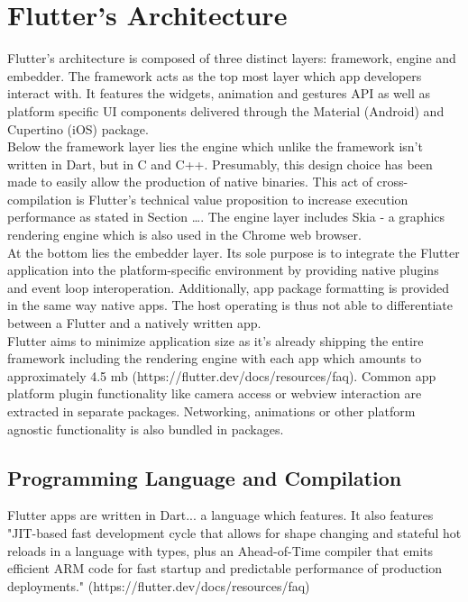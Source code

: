 \section{Flutter's Architecture} \label{section::flutter_architecture}
Flutter's architecture is composed of three distinct layers: framework, engine and embedder. The framework acts as the top most layer which 
app developers interact with. It features the widgets, animation and gestures API as well as platform specific UI components delivered through
the Material (Android) and Cupertino (iOS) package.
\\
Below the framework layer lies the engine which unlike the framework isn't written in Dart, but in C and C++. Presumably, this design choice has been 
made to easily allow the production of native binaries. This act of cross-compilation is Flutter's technical value proposition to increase execution performance as stated in 
Section \dots. The engine layer includes Skia - a graphics rendering engine which is also used in the Chrome web browser.
\\
At the bottom lies the embedder layer. Its sole purpose is to integrate the Flutter application into the platform-specific environment
by providing native plugins and event loop interoperation. 
Additionally, app package formatting is provided in the same way native apps. The host operating is thus not able to differentiate between a Flutter and
a natively written app.\\ 
Flutter aims to minimize application size as it's already shipping the entire framework including the rendering engine with each app which amounts
to approximately 4.5 mb (https://flutter.dev/docs/resources/faq). Common app platform plugin functionality like camera access or webview interaction are extracted in separate packages.
Networking, animations or other platform agnostic functionality is also bundled in packages. 


\subsection{Programming Language and Compilation}
Flutter apps are written in Dart... a language which features. It also features 
"JIT-based fast development cycle that allows for shape changing and stateful hot reloads in a language with types, 
plus an Ahead-of-Time compiler that emits efficient ARM code for fast startup and predictable performance of production deployments." 
(https://flutter.dev/docs/resources/faq)



